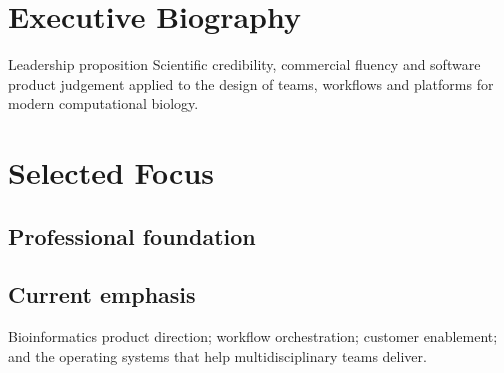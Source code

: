 \documentclass{vitae}
\begin{document}

\section{Executive Biography}

\vspace{6mm}
\begin{CareerHighlight}{Leadership proposition}
Scientific credibility, commercial fluency and software product judgement applied to the design of teams, workflows and platforms for modern computational biology.
\end{CareerHighlight}
\section{Selected Focus}
\begin{minipage}[t]{.49\linewidth}\end{minipage}\hfill
\begin{minipage}[t]{.47\linewidth}
\subsection{Professional foundation}
\subsection{Current emphasis}Bioinformatics product direction; workflow orchestration; customer enablement; and the operating systems that help multidisciplinary teams deliver.
\end{minipage}
\end{document}
